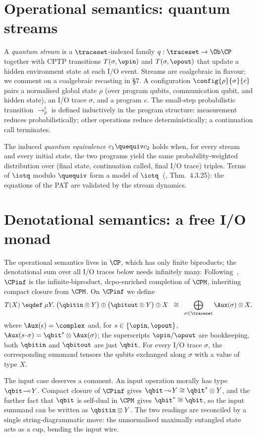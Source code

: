\section{Operational semantics: quantum streams}

A \emph{quantum stream} is a $\traceset$-indexed family $q:\traceset \to \Ob\CP$ together with CPTP transitions $T(\sigma,\opin)$ and $T(\sigma,\opout)$ that update a hidden environment state at each I/O event. Streams are coalgebraic in flavour; we comment on a coalgebraic recasting in \S7. A configuration $\config{\rho}{\sigma}{c}$ pairs a normalised global state $\rho$ (over program qubits, communication qubit, and hidden state), an I/O trace $\sigma$, and a program $c$. The small-step probabilistic transition $\to^t_p$ is defined inductively in the program structure: measurement reduces probabilistically; other operations reduce deterministically; a continuation call terminates.

The induced \emph{quantum equivalence} $c_1 \quequiv c_2$ holds when, for every stream and every initial state, the two programs yield the same probability-weighted distribution over (final state, continuation called, final I/O trace) triples. Terms of $\iotq$ modulo $\quequiv$ form a model of $\iotq$~(\cite{wang_algebraic_2024}, Thm.~4.3.25): the equations of the PAT are validated by the stream dynamics.

\section{Denotational semantics: a free I/O monad}

The operational semantics lives in $\CP$, which has only finite biproducts; the denotational sum over all I/O traces below needs infinitely many. Following~\cite{PaganiSV13}, $\CPinf$ is the infinite-biproduct, dcpo-enriched completion of $\CPM$, inheriting compact closure from $\CPM$. On $\CPinf$ we define
$$
  T(X) \;\eqdef\; \mu Y.\; \bigl(\qbitin \otimes Y\bigr) \oplus \bigl(\qbitout \otimes Y\bigr) \oplus X \;\;\cong\;\; \bigoplus_{\sigma \in \traceset} \Aux(\sigma) \otimes X,
$$
where $\Aux(\epsilon)=\complex$ and, for $s\in\{\opin,\opout\}$, $\Aux(s\!\cdot\!\sigma)=\qbit^{s}\otimes\Aux(\sigma)$; the superscripts $\opin/\opout$ are bookkeeping, both $\qbitin$ and $\qbitout$ are just $\qbit$. For every I/O trace $\sigma$, the corresponding summand tensors the qubits exchanged along $\sigma$ with a value of type $X$.

The input case deserves a comment. An input operation morally has type $\qbit\!\multimap\!Y$. Compact closure of $\CPinf$ gives $\qbit\!\multimap\!Y \cong \qbit^{*}\otimes Y$, and the further fact that $\qbit$ is self-dual in $\CPM$ gives $\qbit^{*}\cong\qbit$, so the input summand can be written as $\qbitin \otimes Y$. The two readings are reconciled by a single string-diagrammatic move: the unnormalised maximally entangled state acts as a cup, bending the input wire.


